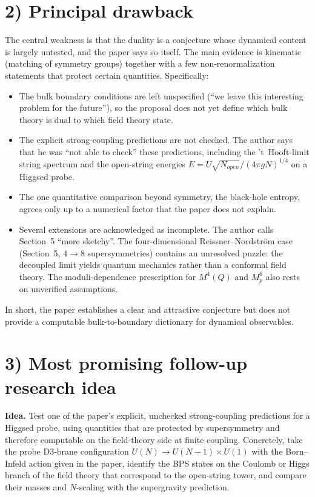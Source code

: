 \documentclass[11pt]{article}
\begin{document}
\section*{2) Principal drawback}

The central weakness is that the duality is a conjecture whose dynamical content is largely untested, and the paper says so itself. The main evidence is kinematic (matching of symmetry groups) together with a few non-renormalization statements that protect certain quantities. Specifically:
\begin{itemize}
  \item The bulk boundary conditions are left unspecified (``we leave this interesting problem for the future''), so the proposal does not yet define which bulk theory is dual to which field theory state.
  \item The explicit strong-coupling predictions are not checked. The author says that he was ``not able to check'' these predictions, including the 't~Hooft-limit string spectrum and the open-string energies $E = U\sqrt{N_{open}}/(4\pi gN)^{1/4}$ on a Higgsed probe.
  \item The one quantitative comparison beyond symmetry, the black-hole entropy, agrees only up to a numerical factor that the paper does not explain.
  \item Several extensions are acknowledged as incomplete. The author calls Section~5 ``more sketchy''. The four-dimensional Reissner--Nordstr\"om case (Section~5, $4\to 8$ supersymmetries) contains an unresolved puzzle: the decoupled limit yields quantum mechanics rather than a conformal field theory. The moduli-dependence prescription for $M^4(Q)$ and $M^6_p$ also rests on unverified assumptions.
\end{itemize}
In short, the paper establishes a clear and attractive conjecture but does not provide a computable bulk-to-boundary dictionary for dynamical observables.

\section*{3) Most promising follow-up research idea}

\textbf{Idea.} Test one of the paper's explicit, unchecked strong-coupling predictions for a Higgsed probe, using quantities that are protected by supersymmetry and therefore computable on the field-theory side at finite coupling. Concretely, take the probe D3-brane configuration $U(N)\to U(N-1)\times U(1)$ with the Born--Infeld action given in the paper, identify the BPS states on the Coulomb or Higgs branch of the field theory that correspond to the open-string tower, and compare their masses and $N$-scaling with the supergravity prediction.
\end{document}
